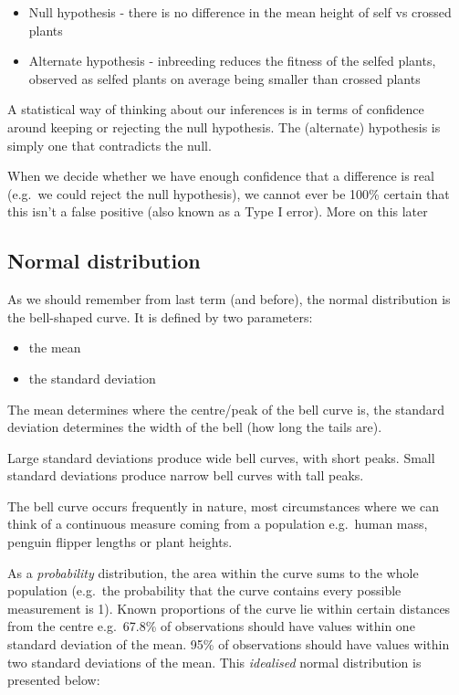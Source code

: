 \documentclass[
]{book}
\makeatletter
\newenvironment{kframe}{%
\medskip{}
\setlength{\fboxsep}{.8em}
 \def\at@end@of@kframe{}%
 \ifinner\ifhmode%
  \def\at@end@of@kframe{\end{minipage}}%
  \begin{minipage}{\columnwidth}%
 \fi\fi%
 \def\FrameCommand##1{\hskip\@totalleftmargin \hskip-\fboxsep
 \colorbox{shadecolor}{##1}\hskip-\fboxsep
     \hskip-\linewidth \hskip-\@totalleftmargin \hskip\columnwidth}%
 \MakeFramed {\advance\hsize-\width
   \@totalleftmargin\z@ \linewidth\hsize
   \@setminipage}}%
 {\par\unskip\endMakeFramed%
 \at@end@of@kframe}
\newenvironment{block}[1]
  {
  \begin{itemize}
  \renewcommand{\labelitemi}{
    \raisebox{-.7\height}[0pt][0pt]{
      {\setkeys{Gin}{width=3em,keepaspectratio}\texttt{[image: images/\#1]}}
    }
  }
  \setlength{\fboxsep}{1em}
  \begin{kframe}
  \item
  }
  {
  \end{kframe}
  \end{itemize}
  }
\newenvironment{rmdnote}
  {\begin{block}{note}}
  {\end{block}}
\makeatother
\begin{document}
\begin{itemize}
\item
  Null hypothesis - there is no difference in the mean height of self vs crossed plants
\item
  Alternate hypothesis - inbreeding reduces the fitness of the selfed plants, observed as selfed plants on average being smaller than crossed plants
\end{itemize}

\begin{rmdnote}
A statistical way of thinking about our inferences is in terms of
confidence around keeping or rejecting the null hypothesis. The
(alternate) hypothesis is simply one that contradicts the null.

When we decide whether we have enough confidence that a difference is
real (e.g.~we could reject the null hypothesis), we cannot ever be 100\%
certain that this isn't a false positive (also known as a Type I error).
More on this later
\end{rmdnote}

\hypertarget{normal-distribution}{%
\subsection{Normal distribution}\label{normal-distribution}}

As we should remember from last term (and before), the normal distribution is the bell-shaped curve. It is defined by two parameters:

\begin{itemize}
\item
  the mean
\item
  the standard deviation
\end{itemize}

The mean determines where the centre/peak of the bell curve is, the standard deviation determines the width of the bell (how long the tails are).

Large standard deviations produce wide bell curves, with short peaks. Small standard deviations produce narrow bell curves with tall peaks.

The bell curve occurs frequently in nature, most circumstances where we can think of a continuous measure coming from a population e.g.~human mass, penguin flipper lengths or plant heights.

As a \emph{probability} distribution, the area within the curve sums to the whole population (e.g.~the probability that the curve contains every possible measurement is 1). Known proportions of the curve lie within certain distances from the centre e.g.~67.8\% of observations should have values within one standard deviation of the mean. 95\% of observations should have values within two standard deviations of the mean. This \emph{idealised} normal distribution is presented below:
\end{document}
